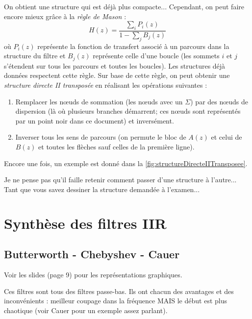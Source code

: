             On obtient une structure qui est déjà plus compacte... Cependant, on peut faire encore mieux grâce à la \textit{règle de Mason} :
            $$
                H(z) = \frac{\sum_i P_i(z)}{1 - \sum_j B_j(z)}
            $$
            où $P_i(z)$ représente la fonction de transfert associé à un parcours dans la structure du filtre et $B_j(z)$ représente celle d'une boucle (les sommets $i$ et $j$ s'étendent sur tous les parcours et toutes les boucles). Les structures déjà données respectent cette règle. Sur base de cette règle, on peut obtenir une \textit{structure directe II transposée} en réalisant les opérations suivantes :
            \begin{enumerate}
                \item Remplacer les nœuds de sommation (les nœuds avec un $\Sigma$) par des nœuds de dispersion (là où plusieurs branches démarrent; ces nœuds sont représentés par un point noir dans ce document) et inversément.
                \item Inverser tous les sens de parcours (on permute le bloc de $A(z)$ et celui de $B(z)$ et toutes les flèches sauf celles de la première ligne).
            \end{enumerate}

            Encore une fois, un exemple est donné dans la \autoref{fig:structureDirecteIITransposee}.

            

            \begin{remarque}
                Je ne pense pas qu'il faille retenir comment passer d'une structure à l'autre... Tant que vous savez dessiner la structure demandée à l'examen...
            \end{remarque}

    \section{Synthèse des filtres IIR}
        \subsection{Butterworth - Chebyshev - Cauer}
            Voir les slides (page 9) pour les représentations graphiques.

            Ces filtres sont tous des filtres passe-bas. Ils ont chacun des avantages et des inconvénients : meilleur coupage dans la fréquence MAIS le début est plus chaotique (voir Cauer pour un exemple assez parlant).

